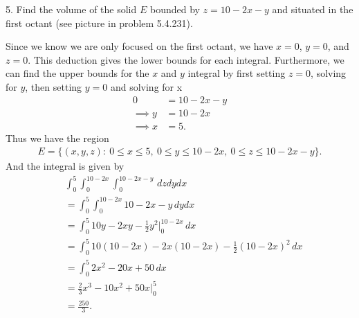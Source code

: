 \documentclass{report}
\begin{document}
    \pagebreak 
    \begin{mdframed}
        5. Find the volume of the solid \(E\) bounded by \(z = 10 - 2x - y\) and situated in the first octant (see picture in problem 5.4.231).
    \end{mdframed}
    \bigbreak \noindent 
    Since we know we are only focused on the first octant, we have $x=0$, $y=0$, and $z=0$. This deduction gives the lower bounds for each integral. Furthermore, we can find the upper bounds for the $x$ and $y$ integral by first setting $z=0$, solving for $y$, then setting $y=0$ and solving for x
    \begin{align*}
        0&=10 - 2x - y  \\
        \implies y &= 10-2x \\
        \implies x&=5
    .\end{align*}
    \bigbreak \noindent 
    Thus we have the region 
    \begin{align*}
        E = \{(x,y,z):\ 0 \leq x \leq 5,\ 0 \leq y \leq 10-2x,\ 0 \leq z \leq 10-2x-y\}
    .\end{align*}
    And the integral is given by
    \begin{align*}
        &\int_{0}^{5}\int_{0}^{10-2x}\int_{0}^{10-2x-y}  \, dzdydx \\
        &=\int_{0}^{5}\int_{0}^{10-2x}10-2x-y  \, dydx \\
        &=\int_{0}^{5} 10y-2xy-\frac{1}{2}y^{2}\bigg|_{0}^{10-2x} \, dx \\
        &=\int_{0}^{5} 10(10-2x)-2x(10-2x)-\frac{1}{2}(10-2x)^{2} \, dx \\
        &=\int_{0}^{5} 2x^{2}-20x+50 \, dx\\
        &=\frac{2}{3}x^{3}-10x^{2}+50x\bigg|^{5}_{0} \\
        &=\frac{250}{3}
    .\end{align*}
\end{document}
